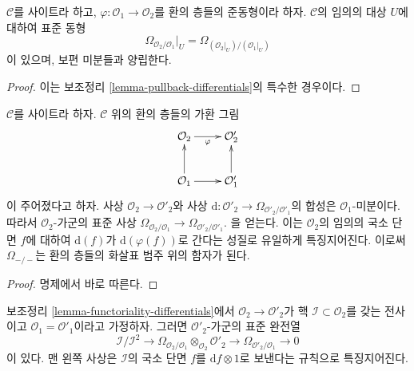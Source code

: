 \begin{lemma}
\label{lemma-localize-differentials}
$\mathcal{C}$를 사이트라 하고,
$\varphi : \mathcal{O}_1 \to \mathcal{O}_2$를 환의 층들의 준동형이라 하자.
$\mathcal{C}$의 임의의 대상 $U$에 대하여 표준 동형
$$
\Omega_{\mathcal{O}_2/\mathcal{O}_1}|_U =
\Omega_{(\mathcal{O}_2|_U)/(\mathcal{O}_1|_U)}
$$
이 있으며, 보편 미분들과 양립한다.
\end{lemma}

\begin{proof}
이는 보조정리 \ref{lemma-pullback-differentials}의 특수한 경우이다.
\end{proof}

\begin{lemma}
\label{lemma-functoriality-differentials}
$\mathcal{C}$를 사이트라 하자. $\mathcal{C}$ 위의 환의 층들의 가환 그림
$$
\xymatrix{
\mathcal{O}_2 \ar[r]_\varphi & \mathcal{O}_2' \\
\mathcal{O}_1 \ar[r] \ar[u] & \mathcal{O}'_1 \ar[u]
}
$$
이 주어졌다고 하자. 사상 $\mathcal{O}_2 \to \mathcal{O}'_2$와 사상
$\text{d} : \mathcal{O}'_2 \to \Omega_{\mathcal{O}'_2/\mathcal{O}'_1}$의
합성은 $\mathcal{O}_1$-미분이다. 따라서 $\mathcal{O}_2$-가군의 표준 사상
$\Omega_{\mathcal{O}_2/\mathcal{O}_1} \to
\Omega_{\mathcal{O}'_2/\mathcal{O}'_1}$.
을 얻는다. 이는 $\mathcal{O}_2$의 임의의 국소 단면 $f$에 대하여
$\text{d}(f)$가 $\text{d}(\varphi(f))$로 간다는 성질로 유일하게
특징지어진다. 이로써 $\Omega_{-/-}$는 환의 층들의 화살표 범주 위의
함자가 된다.
\end{lemma}

\begin{proof}
명제에서 바로 따른다.
\end{proof}

\begin{lemma}
\label{lemma-differential-seq}
보조정리 \ref{lemma-functoriality-differentials}에서
$\mathcal{O}_2 \to \mathcal{O}'_2$가 핵
$\mathcal{I} \subset \mathcal{O}_2$를 갖는 전사이고
$\mathcal{O}_1 = \mathcal{O}'_1$이라고 가정하자.
그러면 $\mathcal{O}'_2$-가군의 표준 완전열
$$
\mathcal{I}/\mathcal{I}^2
\longrightarrow
\Omega_{\mathcal{O}_2/\mathcal{O}_1} \otimes_{\mathcal{O}_2} \mathcal{O}'_2
\longrightarrow
\Omega_{\mathcal{O}'_2/\mathcal{O}_1}
\longrightarrow
0
$$
이 있다. 맨 왼쪽 사상은 $\mathcal{I}$의 국소 단면 $f$를
$\text{d}f \otimes 1$로 보낸다는 규칙으로 특징지어진다.
\end{lemma}

